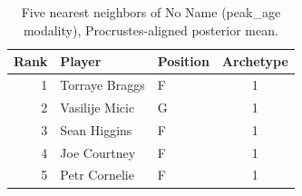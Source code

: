 \begin{table}[htbp]
  \centering\small
  \begin{tabular}{rllc}
    \toprule
    Rank & Player & Position & Archetype \\
    \midrule
    1 & Torraye Braggs & F & 1 \\
    2 & Vasilije Micic & G & 1 \\
    3 & Sean Higgins & F & 1 \\
    4 & Joe Courtney & F & 1 \\
    5 & Petr Cornelie & F & 1 \\
    \bottomrule
  \end{tabular}
  \caption{Five nearest neighbors of No Name (peak_age modality), Procrustes-aligned posterior mean.}
  \label{tab:No_Name_neighbors_peak_age}
\end{table}

